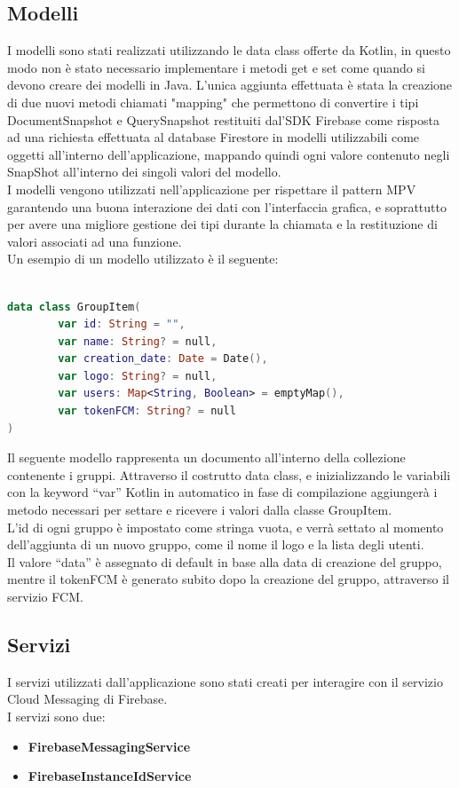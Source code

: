 \subsection{Modelli}
I modelli sono stati realizzati utilizzando le data class offerte da Kotlin, in questo modo non è stato necessario implementare i metodi get e set come quando si devono creare dei modelli in Java. L'unica aggiunta effettuata è stata la creazione di due nuovi metodi chiamati "mapping" che permettono di convertire i tipi DocumentSnapshot e QuerySnapshot restituiti dal'SDK Firebase come risposta ad una richiesta effettuata al database Firestore in modelli utilizzabili come oggetti all'interno dell'applicazione, mappando quindi ogni valore contenuto negli SnapShot all'interno dei singoli valori del modello.\\
I modelli vengono utilizzati nell'applicazione per rispettare il pattern MPV garantendo una buona interazione dei dati con l'interfaccia grafica, e soprattutto per avere una migliore gestione dei tipi durante la chiamata e la restituzione di valori associati ad una funzione.\\
Un esempio di un modello utilizzato è il seguente:
\begin{lstlisting}[language=kotlin,caption={Aggiunta elemento Todolist}]

data class GroupItem(
        var id: String = "",
        var name: String? = null,
        var creation_date: Date = Date(),
        var logo: String? = null,
        var users: Map<String, Boolean> = emptyMap(),
        var tokenFCM: String? = null
)
\end{lstlisting}
Il seguente modello rappresenta un documento all'interno della collezione contenente i gruppi. Attraverso il costrutto data class, e inizializzando le variabili con la keyword ``var'' Kotlin in automatico in fase di compilazione aggiungerà i metodo necessari per settare e ricevere i valori dalla classe GroupItem.\\
L'id di ogni gruppo è impostato come stringa vuota, e verrà settato al momento dell'aggiunta di un nuovo gruppo, come il nome il logo e la lista degli utenti.\\
Il valore ``data'' è assegnato di default in base alla data di creazione del gruppo, mentre il tokenFCM è generato subito dopo la creazione del gruppo, attraverso il servizio FCM.

\subsection{Servizi}
I servizi utilizzati dall'applicazione sono stati creati per interagire con il servizio Cloud Messaging di Firebase.\\
I servizi sono due:
\begin{itemize}
    \item \textbf{FirebaseMessagingService}
    \item \textbf{FirebaseInstanceIdService}
\end{itemize}

